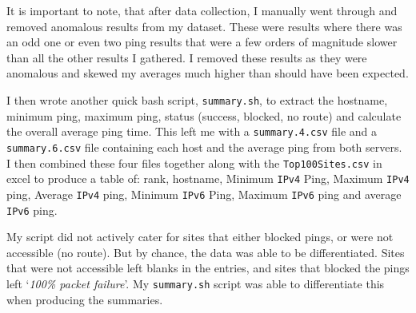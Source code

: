 \documentclass[a4paper]{article}
\def \IPF {\texttt{IPv4}}
\def \IPS {\texttt{IPv6}}
\begin{document}
It is important to note, that after data collection, I manually went through and removed anomalous results from my dataset.
These were results where there was an odd one or even two ping results that were a few orders of magnitude slower than all the other results I gathered.
I removed these results as they were anomalous and skewed my averages much higher than should have been expected.

I then wrote another quick bash script, \texttt{summary.sh}, to extract the hostname, minimum ping, maximum ping, status (success, blocked, no route)
  and calculate the overall average ping time.
This left me with a \texttt{summary.4.csv} file and a \texttt{summary.6.csv} file containing each host and the average ping from both servers.
I then combined these four files together along with the \texttt{Top100Sites.csv} in excel to produce a table of:
rank, hostname, Minimum {\IPF} Ping, Maximum {\IPF} ping, Average {\IPF} ping, Minimum {\IPS} Ping, Maximum {\IPS} ping and average {\IPS} ping.

My script did not actively cater for sites that either blocked pings, or were not accessible (no route).
But by chance, the data was able to be differentiated.
Sites that were not accessible left blanks in the entries, and sites that blocked the pings left `\textit{100\% packet failure}'.
My \texttt{summary.sh} script was able to differentiate this when producing the summaries.






\end{document}
